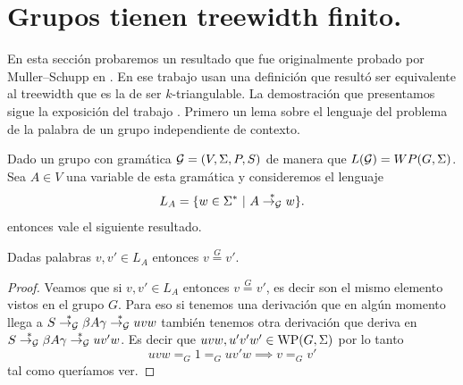 \documentclass[tesis.tex]{subfiles}
\begin{document}
\section{Grupos \ic tienen treewidth finito.}\label{secc_MuSch}

En esta sección probaremos un resultado que fue originalmente probado por Muller--Schupp en \cite{muller1985theory}.
En ese trabajo usan una definición que resultó ser equivalente al treewidth que es la de ser $k$-triangulable.
La demostración que presentamos sigue la exposición del trabajo \cite{diekert2017context}.
Primero un lema sobre el lenguaje del problema de la palabra de un grupo independiente de contexto.


Dado un grupo \ic con gramática ${\cal G} = (V, \Sigma, P, S)$ de manera que $L({\cal G}) = WP(G,\Sigma)$.
Sea $A \in V$ una variable de esta gramática y consideremos el lenguaje
\[
	L_A = \{ w \in \Sigma^*  \ | \ A \overset{*}{\to_{\cal G}} w  \}.
\]
entonces vale el siguiente resultado.

\begin{lema}\label{palabras-wp}
	Dadas palabras $v,v' \in L_{A}$ entonces $v \overset{G}{=} v'$.
\end{lema}

\begin{proof}
	Veamos que si $v,v' \in L_A$ entonces $v \overset{G}{=} v'$, es decir son el mismo elemento vistos en el grupo $G$. 
	Para eso si tenemos una derivación que en algún momento llega a $S \overset{*}{\to_{\cal G}} \beta A \gamma \overset{*}{\to_{\cal G}} uvw$ también tenemos otra derivación que deriva en $S \overset{*}{\to_{\cal G}} \beta A \gamma  \overset{*}{\to_{\cal G}} uv'w$. 
	Es decir que $uvw, u'v'w' \in \text{WP}(G, \Sigma)$ por lo tanto 
	\begin{equation*}
		uvw =_G 1 =_G uv'w \implies v =_G v'
	\end{equation*}
	tal como queríamos ver.
\end{proof}
\end{document}
